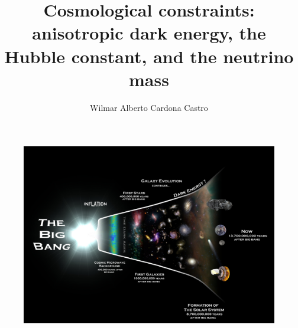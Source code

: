 \documentclass{beamer}
\author[Wilmar Alberto Cardona Castro]{Wilmar Alberto Cardona Castro}
\title[Cosmological constraints: anisotropic dark energy, the Hubble constant, and the neutrino mass]{Cosmological constraints: anisotropic dark energy, the Hubble constant, and the neutrino mass}
\begin{document}


\begin{frame}
\begin{figure}[hbtp]
\centering
\includegraphics[width=\textwidth]{../figures/Timeline_portrait.jpg}
\end{figure}

\end{frame}
\end{document}
